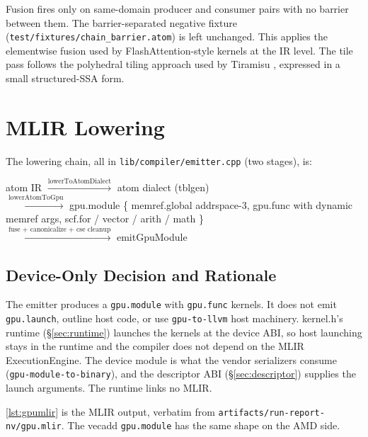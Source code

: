 \documentclass[10pt,twoside]{article}
\begin{document}
Fusion fires only on same-domain producer and consumer pairs with no barrier between them.
The barrier-separated negative fixture (\texttt{test/fixtures/chain\_barrier.atom}) is left
unchanged. This applies the elementwise fusion used by FlashAttention-style kernels
\cite{flashattn2022,flashattn2} at the IR level. The tile pass follows the polyhedral tiling
approach used by Tiramisu \cite{tiramisu2019}, expressed in a small structured-SSA form.

\section{MLIR Lowering}
\label{sec:mlir}

The lowering chain, all in \texttt{lib/compiler/emitter.cpp} (two stages), is:

\begin{center}
\ttfamily
atom IR $\xrightarrow{\text{lowerToAtomDialect}}$ atom dialect (tblgen)\\
$\xrightarrow{\text{lowerAtomToGpu}}$ gpu.module \{ memref.global addrspace-3, gpu.func with dynamic
memref args, scf.for / vector / arith / math \}\\
$\xrightarrow{\text{fuse + canonicalize + cse cleanup}}$ emitGpuModule
\end{center}

\subsection{Device-Only Decision and Rationale}
\label{sec:device-only}

The emitter produces a \texttt{gpu.module} with \texttt{gpu.func} kernels. It does not emit
\texttt{gpu.launch}, outline host code, or use \texttt{gpu-to-llvm} host machinery. kernel.h's
runtime (\S\ref{sec:runtime}) launches the kernels at the device ABI, so host launching stays
in the runtime and the compiler does not depend on the MLIR ExecutionEngine. The device
module is what the vendor serializers consume (\texttt{gpu-module-to-binary}), and the
descriptor ABI (\S\ref{sec:descriptor}) supplies the launch arguments. The runtime links no
MLIR.

\cref{lst:gpumlir} is the MLIR output, verbatim from
\texttt{artifacts/run-report-nv/gpu.mlir}. The vecadd \texttt{gpu.module} has the same shape
on the AMD side.
\end{document}
